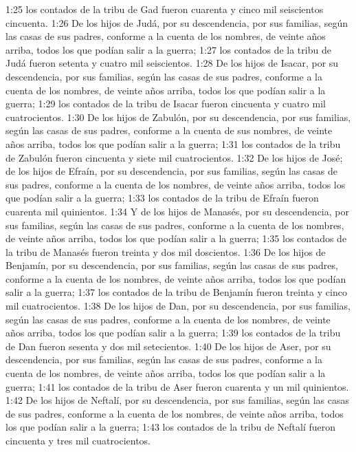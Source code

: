 1:25 los contados de la tribu de Gad fueron cuarenta y cinco mil seiscientos cincuenta.  
1:26 De los hijos de Judá, por su descendencia, por sus familias, según las casas de sus padres, conforme a la cuenta de los nombres, de veinte años arriba, todos los que podían salir a la guerra;  
1:27 los contados de la tribu de Judá fueron setenta y cuatro mil seiscientos.  
1:28 De los hijos de Isacar, por su descendencia, por sus familias, según las casas de sus padres, conforme a la cuenta de los nombres, de veinte años arriba, todos los que podían salir a la guerra;  
1:29 los contados de la tribu de Isacar fueron cincuenta y cuatro mil cuatrocientos.  
1:30 De los hijos de Zabulón, por su descendencia, por sus familias, según las casas de sus padres, conforme a la cuenta de sus nombres, de veinte años arriba, todos los que podían salir a la guerra;  
1:31 los contados de la tribu de Zabulón fueron cincuenta y siete mil cuatrocientos.  
1:32 De los hijos de José; de los hijos de Efraín, por su descendencia, por sus familias, según las casas de sus padres, conforme a la cuenta de los nombres, de veinte años arriba, todos los que podían salir a la guerra;  
1:33 los contados de la tribu de Efraín fueron cuarenta mil quinientos.  
1:34 Y de los hijos de Manasés, por su descendencia, por sus familias, según las casas de sus padres, conforme a la cuenta de los nombres, de veinte años arriba, todos los que podían salir a la guerra;  
1:35 los contados de la tribu de Manasés fueron treinta y dos mil doscientos. 
1:36 De los hijos de Benjamín, por su descendencia, por sus familias, según las casas de sus padres, conforme a la cuenta de los nombres, de veinte años arriba, todos los que podían salir a la guerra;  
1:37 los contados de la tribu de Benjamín fueron treinta y cinco mil cuatrocientos.  
1:38 De los hijos de Dan, por su descendencia, por sus familias, según las casas de sus padres, conforme a la cuenta de los nombres, de veinte años arriba, todos los que podían salir a la guerra;  
1:39 los contados de la tribu de Dan fueron sesenta y dos mil setecientos.  
1:40 De los hijos de Aser, por su descendencia, por sus familias, según las casas de sus padres, conforme a la cuenta de los nombres, de veinte años arriba, todos los que podían salir a la guerra;  
1:41 los contados de la tribu de Aser fueron cuarenta y un mil quinientos.  
1:42 De los hijos de Neftalí, por su descendencia, por sus familias, según las casas de sus padres, conforme a la cuenta de los nombres, de veinte años arriba, todos los que podían salir a la guerra;  
1:43 los contados de la tribu de Neftalí fueron cincuenta y tres mil cuatrocientos.  
